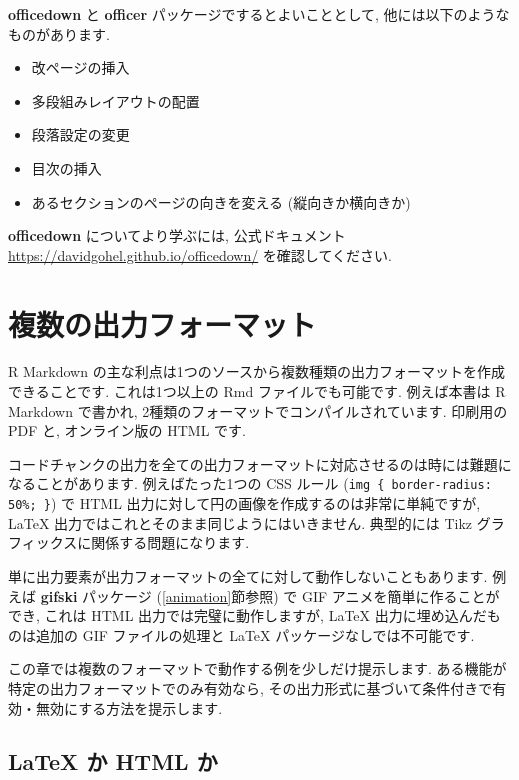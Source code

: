 \documentclass[
  11pt,
]{bxjsreport}
\begin{document}
\textbf{officedown} と \textbf{officer} パッケージでするとよいこととして, 他には以下のようなものがあります.

\begin{itemize}
\item
  改ページの挿入
\item
  多段組みレイアウトの配置
\item
  段落設定の変更
\item
  目次の挿入
\item
  あるセクションのページの向きを変える (縦向きか横向きか)
\end{itemize}

\textbf{officedown} についてより学ぶには, 公式ドキュメント \url{https://davidgohel.github.io/officedown/} を確認してください.

\hypertarget{multi-formats}{%
\chapter{複数の出力フォーマット}\label{multi-formats}}

R Markdown の主な利点は1つのソースから複数種類の出力フォーマットを作成できることです. これは1つ以上の Rmd ファイルでも可能です. 例えば本書は R Markdown で書かれ, 2種類のフォーマットでコンパイルされています. 印刷用の PDF と, オンライン版の HTML です.

コードチャンクの出力を全ての出力フォーマットに対応させるのは時には難題になることがあります. 例えばたった1つの CSS ルール (\texttt{img \{ border-radius: 50\%; \}}) で HTML 出力に対して円の画像を作成するのは非常に単純ですが, LaTeX 出力ではこれとそのまま同じようにはいきません. 典型的には Tikz グラフィックスに関係する問題になります.

単に出力要素が出力フォーマットの全てに対して動作しないこともあります. 例えば \textbf{gifski} パッケージ \autocite{R-gifski} (\ref{animation}節参照) で GIF アニメを簡単に作ることができ, これは HTML 出力では完璧に動作しますが, LaTeX 出力に埋め込んだものは追加の GIF ファイルの処理と LaTeX パッケージなしでは不可能です.

この章では複数のフォーマットで動作する例を少しだけ提示します. ある機能が特定の出力フォーマットでのみ有効なら, その出力形式に基づいて条件付きで有効・無効にする方法を提示します.

\hypertarget{latex-html}{%
\section{LaTeX か HTML か}\label{latex-html}}
\end{document}
